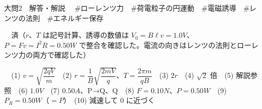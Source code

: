 \documentclass[paper=b5, fontsize=8pt, fleqn, twoside]{jlreq}
\begin{document}
\begin{ascolorbox4A}[75点・30分]{大問2　解答・解説}
　\#ローレンツ力　\#荷電粒子の円運動　\#電磁誘導　\#レンツの法則　\#エネルギー保存\par
{}　済（$r$、$T$ は記号計算、誘導の数値は $V_0=B\ell v=1.0\unit{V}$、$P=Fv=I^2R=0.50\unit{W}$ で整合を確認した。電流の向きはレンツの法則とローレンツ力の両方で確認した）\par
{}　(1) $v=\sqrt{\dfrac{2qV}{m}}$　(2) $r=\dfrac{1}{B}\sqrt{\dfrac{2mV}{q}}$、$T=\dfrac{2\pi m}{qB}$　(3) $2r$　(4) $\sqrt{2}$ 倍　(5) 解説参照　(6) $1.0\unit{V}$　(7) $0.50\unit{A}$、P→Q、Q　(8) $F=0.10\unit{N}$、$P=0.50\unit{W}$　(9) $P_R=0.50\unit{W}$（$=P$）　(10) 減速して $0$ に近づく
\end{ascolorbox4A}
\end{document}
